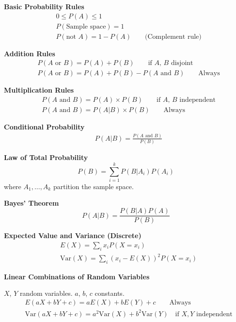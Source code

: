 
\begin{multicols}{2} %

\textbf{Basic Probability Rules}
\begin{align*}
    &0 \leq P(A) \leq 1 \\
    &P(\text{Sample space}) = 1 \\
    &P(\text{not } A) = 1 - P(A) \qquad \text{(Complement rule)}
\end{align*}

\textbf{Addition Rules}
\begin{align*}
    &P(A \text{ or } B) = P(A) + P(B) \qquad \text{if $A$, $B$ disjoint} \\
    &P(A \text{ or } B) = P(A) + P(B) - P(A \text{ and } B) \qquad \text{Always}
\end{align*}

\textbf{Multiplication Rules}
\begin{align*}
    &P(A \text{ and } B) = P(A) \times P(B) \qquad \text{if $A$, $B$ independent} \\
    &P(A \text{ and } B) = P(A|B) \times P(B) \qquad \text{Always}
\end{align*}

\textbf{Conditional Probability}
\begin{align*}
    &P(A|B) = \frac{P(A \text{ and } B)}{P(B)} 
\end{align*}

\textbf{Law of Total Probability}
\[
P(B) = \sum_{i=1}^k P(B|A_i)P(A_i)
\]
where $A_1, \ldots, A_k$ partition the sample space.

\textbf{Bayes' Theorem}
\[
P(A|B) = \frac{P(B|A)P(A)}{P(B)}
\]

\textbf{Expected Value and Variance (Discrete)}
\begin{align*}
    &E(X) = \sum_{i} x_i P(X = x_i) \\
    &\mathrm{Var}(X) = \sum_{i} (x_i - E(X))^2 P(X = x_i)
\end{align*}

\textbf{Linear Combinations of Random Variables}

$X$, $Y$ random variables. $a$, $b$, $c$ constants.
\begin{align*}
    &E(aX + bY + c) = aE(X) + bE(Y) + c \qquad \text{Always} \\
    &\mathrm{Var}(aX + bY +c) = a^2\mathrm{Var}(X) + b^2\mathrm{Var}(Y) \quad \text{if } X, Y \text{ independent}
\end{align*}


\end{multicols}
